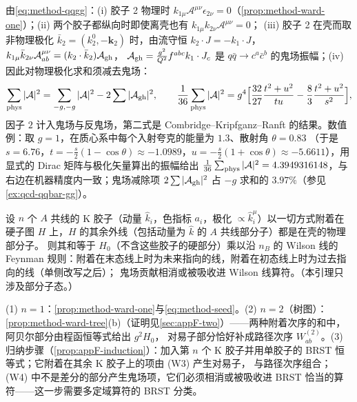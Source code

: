 \begin{example}\label{ex:method-ward-tree}
由\cref{eq:method-qqgg}：(i) 胶子 2 物理时 $k_{1\mu}\mathcal A^{\mu\nu}\epsilon_{2\nu}=0$（\cref{prop:method-ward-one}）；(ii) 两个胶子都纵向时即使离壳也有 $k_{1\mu}k_{2\nu}\mathcal A^{\mu\nu}=0$；
(iii) 胶子 2 在壳而取非物理极化 $\bar k_2=(k_2^0,-\mathbf k_2)$ 时，由流守恒 $k_2\cdot J=-k_1\cdot J$，$k_{1\mu}\bar k_{2\nu}\mathcal A^{\mu\nu}_{ab}=(k_2\cdot\bar k_2)\mathcal A_{\rm gh}$，
$\mathcal A_{\rm gh}=\frac{g^2}{Q^2}f^{abc}k_1\cdot J_c$ 是 $q\bar q\to c^a\bar c^b$ 的鬼场振幅；(iv) 因此对物理极化求和须减去鬼场：
\begin{equation}\label{eq:method-ghostsum}
\sum_{\rm phys}|\mathcal A|^2=\sum_{-g,-g}|\mathcal A|^2-2\sum|\mathcal A_{\rm gh}|^2 ,\qquad
\frac1{36}\sum_{\rm phys}|\mathcal A|^2=g^4\Bigl[\frac{32}{27}\frac{t^2+u^2}{tu}-\frac83\frac{t^2+u^2}{s^2}\Bigr],
\end{equation}
因子 $2$ 计入鬼场与反鬼场，第二式是 Combridge--Kripfganz--Ranft 的结果\cite{CombridgeKripfganzRanft1977}。数值例：取 $g=1$，在质心系中每个入射夸克的能量为 $1.3$、散射角 $\theta=0.83$
（于是 $s=6.76$，$t=-\frac s2(1-\cos\theta)\approx-1.0989$，$u=-\frac s2(1+\cos\theta)\approx-5.6611$），用显式的 Dirac 矩阵与极化矢量算出的振幅给出
$\frac1{36}\sum_{\rm phys}|\mathcal A|^2=4.3949316148$，与右边在机器精度内一致；鬼场减除项 $2\sum|\mathcal A_{\rm gh}|^2$ 占 $-g$ 求和的 $3.97\%$（参见\cref{ex:qcd-qqbar-gg}）。
\end{example}

\begin{lemma}\label{lem:method-ward-multi}
设 $n$ 个 $A$ 共线的 K 胶子（动量 $\hat k_i$，色指标 $a_i$，极化 $\propto\hat k_i^\mu$）以一切方式附着在硬子图 $H$ 上，$H$ 的其余外线（包括动量为 $\hat k$ 的 $A$ 共线部分子）都是在壳的物理部分子。
则其和等于 $H_0$（不含这些胶子的硬部分）乘以沿 $n_B$ 的 Wilson 线的 Feynman 规则：附着在末态线上时为未来指向的线，附着在初态线上时为过去指向的线（单侧改写之后）；
鬼场贡献相消或被吸收进 Wilson 线算符。（本引理只涉及部分子态。）
\end{lemma}

\begin{proofsketch}
(1) $n=1$：\cref{prop:method-ward-one}与\cref{eq:method-seed}。(2) $n=2$（树图）：\cref{prop:method-ward-tree}(b)（证明见\cref{sec:appF-two}）——两种附着次序的和中，阿贝尔部分由程函恒等式给出 $g^2H_0$，
对易子部分恰好补成路径次序 $W^{(2)}_{ab}$。(3) 归纳步骤（\cref{prop:appF-induction}）：加入第 $n$ 个 K 胶子并用单胶子的 BRST 恒等式；它附着在其余 K 胶子上的项由 (W3) 产生对易子，
与路径次序组合；(W4) 中不是差分的部分产生鬼场项，它们必须相消或被吸收进 BRST 恰当的算符——这一步需要多定域算符的 BRST 分类。
\end{proofsketch}

